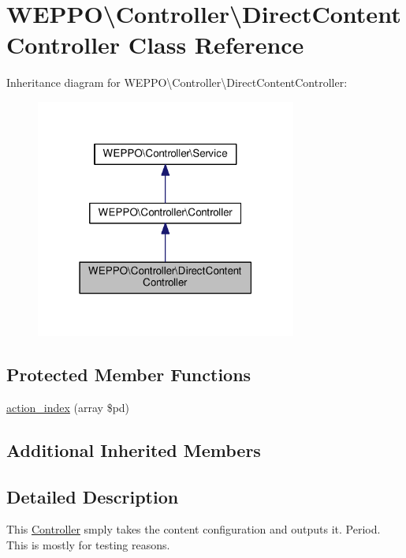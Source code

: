 \hypertarget{classWEPPO_1_1Controller_1_1DirectContentController}{}\section{W\+E\+P\+PO\textbackslash{}Controller\textbackslash{}Direct\+Content\+Controller Class Reference}
\label{classWEPPO_1_1Controller_1_1DirectContentController}


Inheritance diagram for W\+E\+P\+PO\textbackslash{}Controller\textbackslash{}Direct\+Content\+Controller\+:\nopagebreak
\begin{figure}[H]
\begin{center}
\leavevmode
\includegraphics[width=243pt]{classWEPPO_1_1Controller_1_1DirectContentController__inherit__graph}
\end{center}
\end{figure}
\subsection*{Protected Member Functions}
\begin{DoxyCompactItemize}
\item 
\hyperlink{classWEPPO_1_1Controller_1_1DirectContentController_aa9713137484a497715c8a7e6928d9f10}{action\+\_\+index} (array \$pd)
\end{DoxyCompactItemize}
\subsection*{Additional Inherited Members}


\subsection{Detailed Description}
This \hyperlink{classWEPPO_1_1Controller_1_1Controller}{Controller} smply takes the \textquotesingle{}content\textquotesingle{} configuration and outputs it. Period. This is mostly for testing reasons.

